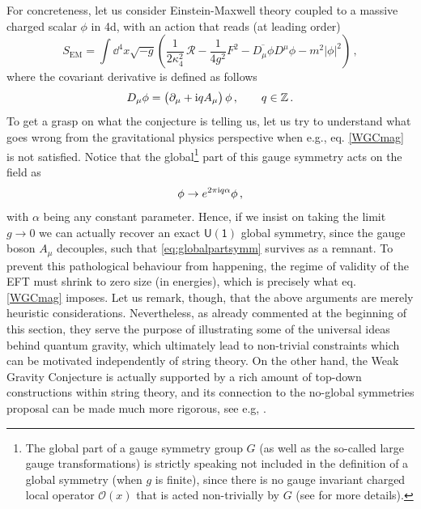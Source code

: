 For concreteness, let us consider Einstein-Maxwell theory coupled to a massive charged scalar $\phi$ in 4d, with an action that reads (at leading order)
%
\begin{equation}
\label{eq:EinsteinMaxwell}
S_{\mathrm{EM}}=\int \dd^{4} x \sqrt{-g}\left(\frac{1}{2 \kappa_4^2}\, \mathcal{R}-\frac{1}{4 g^{2}} F^{2} - \overline{D_\mu \phi} D^\mu \phi - m^2 |\phi|^2 \right)\, ,
\end{equation}
%
where the covariant derivative is defined as follows
%
\begin{equation}
D_\mu \phi= \left(\partial_\mu + \text{i} q A_\mu \right) \phi\, , \qquad q \in {\mathbb{Z}}\, .
\end{equation}
%
To get a grasp on what the conjecture is telling us, let us try to understand what goes wrong from the gravitational physics perspective when e.g., eq. \eqref{WGCmag} is not satisfied. Notice that the global\footnote{The global part of a gauge symmetry group $G$ (as well as the so-called large gauge transformations) is strictly speaking not included in the definition of a global symmetry (when $g$ is finite), since there is no gauge invariant charged local operator $\mathcal{O}(x)$ that is acted non-trivially by $G$ (see \cite{vanBeest:2021lhn} for more details).} part of this gauge symmetry acts on the field as
%
\begin{equation}\label{eq:globalpartsymm}
\phi \rightarrow e^{2\pi \text{i} q \alpha} \phi\, ,
\end{equation}
%
with $\alpha$ being any constant parameter. Hence, if we insist on taking the limit $g\rightarrow 0$ we can actually recover an exact $\mathsf{U(1)}$ global symmetry, since the gauge boson $A_{\mu}$ decouples, such that \eqref{eq:globalpartsymm} survives as a remnant. To prevent this pathological behaviour from happening, the regime of validity of the EFT must shrink to zero size (in energies), which is precisely what eq. \eqref{WGCmag} imposes. Let us remark, though, that the above arguments are merely heuristic considerations. Nevertheless, as already commented at the beginning of this section, they serve the purpose of illustrating some of the universal ideas behind quantum gravity, which ultimately lead to non-trivial constraints which can be motivated independently of string theory. On the other hand, the Weak Gravity Conjecture is actually supported by a rich amount of top-down constructions within string theory, and its connection to the no-global symmetries proposal can be made much more rigorous, see e.g, \cite{Harlow:2018jwu, Harlow:2018tng,Montero:2018fns}.

